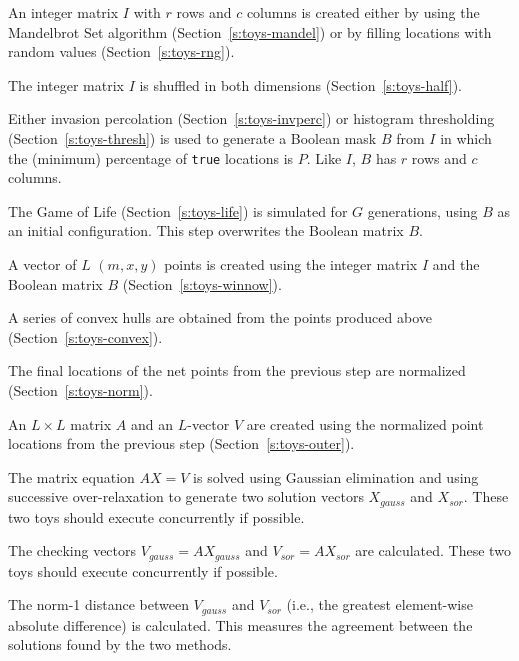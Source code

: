 \begin{itemlist}

\item	An integer matrix $I$ with $r$ rows and $c$ columns is created
	either by using the Mandelbrot Set algorithm (Section~\ref{s:toys-mandel})
	or by filling locations with random values (Section~\ref{s:toys-rng}).
	\label{e:chain-choice-1}

\item	The integer matrix $I$ is shuffled in both dimensions (Section~\ref{s:toys-half}).

\item	Either invasion percolation (Section~\ref{s:toys-invperc}) or histogram thresholding (Section~\ref{s:toys-thresh}) is used
	to generate a Boolean mask $B$ from $I$ in which the (minimum) percentage of {\tt{true}} locations is $P$.
	Like $I$, $B$ has $r$ rows and $c$ columns.
	\label{e:chain-choice-2}

\item	The Game of Life (Section~\ref{s:toys-life}) is simulated for $G$ generations, using $B$ as an initial configuration.
	This step overwrites the Boolean matrix $B$.

\item	A vector of $L$ $(m,x,y)$ points is created using the integer matrix $I$ and the Boolean matrix $B$ (Section~\ref{s:toys-winnow}).

\item	A series of convex hulls are obtained from the points produced above (Section~\ref{s:toys-convex}).

\item	The final locations of the net points from the previous step are normalized (Section~\ref{s:toys-norm}).

\item	An $L{\times}L$ matrix $A$ and an $L$-vector $V$ are created using the normalized point locations from the previous step
	(Section~\ref{s:toys-outer}).

\item	The matrix equation $AX=V$ is solved using Gaussian elimination and using successive over-relaxation
	to generate two solution vectors $X_{gauss}$ and $X_{sor}$.
	These two toys should execute concurrently if possible.

\item	The checking vectors $V_{gauss}=AX_{gauss}$ and $V_{sor}=AX_{sor}$ are calculated.
	These two toys should execute concurrently if possible.

\item	The norm-1 distance between $V_{gauss}$ and $V_{sor}$ (i.e., the greatest element-wise absolute difference) is calculated.
	This measures the agreement between the solutions found by the two methods.

\end{itemlist}

